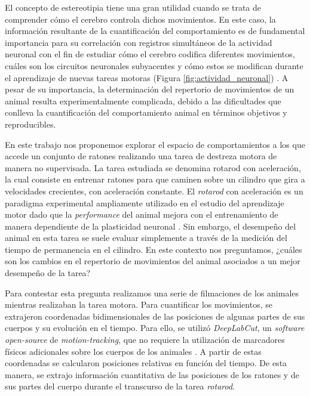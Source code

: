 El concepto de estereotipia tiene una gran utilidad cuando se trata de comprender cómo el cerebro controla dichos movimientos.
En este caso, la información resultante de la cuantificación del comportamiento es de fundamental importancia para su correlación con registros simultáneos de la actividad neuronal con el fin de estudiar cómo el cerebro codifica diferentes movimientos, cuáles son los circuitos neuronales subyacentes y cómo estos se modifican durante el aprendizaje de nuevas tareas motoras (Figura \ref{fig:actividad_neuronal}) \cite{esposito_defensive,levy_representation}. A pesar de su importancia, la determinación del repertorio de movimientos de un animal resulta experimentalmente complicada, debido a las dificultades que conlleva la cuantificación del comportamiento animal en términos objetivos y reproducibles.

En este trabajo nos proponemos explorar el espacio de comportamientos a los que accede un conjunto de ratones realizando una tarea de destreza motora de manera no supervisada. La tarea estudiada se denomina rotarod con aceleración, la cual consiste en entrenar ratones para que caminen sobre un cilindro que gira a velocidades crecientes, con aceleración constante. El \textit{rotarod} con aceleración es un paradigma experimental ampliamente utilizado en el estudio del aprendizaje motor dado que la \textit{performance} del animal mejora con el entrenamiento de manera dependiente de la plasticidad neuronal \cite{costa_motor_learning}. Sin embargo, el desempeño del animal en esta tarea se suele evaluar simplemente a través de la medición del tiempo de permanencia en el cilindro. En este contexto nos preguntamos, ¿cuáles son los cambios en el repertorio de movimientos del animal asociados a un mejor desempeño de la tarea? 

Para contestar esta pregunta realizamos una serie de filmaciones de los animales mientras realizaban la tarea motora. Para cuantificar los movimientos, se extrajeron coordenadas bidimensionales de las posiciones de algunas partes de sus cuerpos y su evolución en el tiempo. Para ello, se utilizó \textit{DeepLabCut}, un \textit{software} \textit{open-source} de \textit{motion-tracking}, que no requiere la utilización de marcadores físicos adicionales sobre los cuerpos de los animales \cite{mathis_deeplabcut}. A partir de estas coordenadas se calcularon posiciones relativas en función del tiempo. De esta manera, se extrajo información cuantitativa de las posiciones de los ratones y de sus partes del cuerpo durante el transcurso de la tarea \textit{rotarod}.

